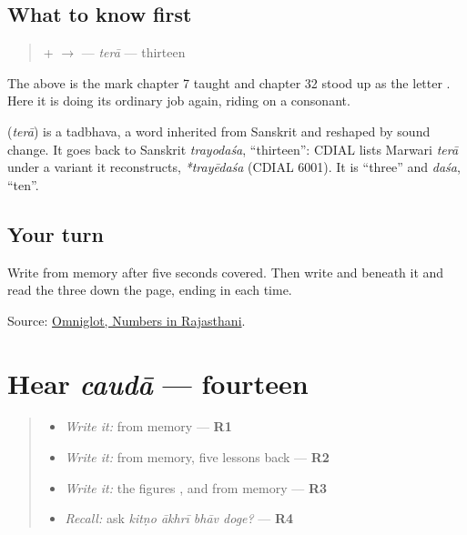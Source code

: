 \subsection*{What to know first}
\begin{quote}
\textbf{} + \textbf{} $\to$ \textbf{} — \emph{terā} — thirteen
\end{quote}

The \textbf{} above \textbf{} is the mark chapter 7 taught and chapter 32 stood up as the letter \textbf{}. Here it is doing its ordinary job again, riding on a consonant.

\begin{cousinweb}
\textbf{} (\emph{terā}) is a tadbhava, a word inherited from Sanskrit and reshaped by sound change. It goes back to Sanskrit \emph{trayodaśa}, \textquotedblleft{}thirteen\textquotedblright{}: CDIAL lists Marwari \emph{terā} under a variant it reconstructs, \emph{*trayēdaśa} (CDIAL 6001). It is \textquotedblleft{}three\textquotedblright{} and \emph{daśa}, \textquotedblleft{}ten\textquotedblright{}.
\end{cousinweb}

\subsection*{Your turn}
Write \textbf{} from memory after five seconds covered. Then write \textbf{} and \textbf{} beneath it and read the three down the page, ending in \textbf{} each time.

\begin{tcolorbox}[breakable,colback=teal!4,colframe=teal!35!black,title={Before you move on}]
Source: \href{https://www.omniglot.com/language/numbers/rajasthani.htm}{Omniglot, Numbers in Rajasthani}.
\end{tcolorbox}
\section[caudā]{Hear \emph{caudā} — fourteen}

\label{lesson:MW-C37-hear-chauda}



\begin{quote}
\begin{itemize}
\raggedright
  \item \emph{Write it:} \textbf{} from memory — \textbf{R1}
  \item \emph{Write it:} \textbf{} from memory, five lessons back — \textbf{R2}
  \item \emph{Write it:} the figures \textbf{}, \textbf{} and \textbf{} from memory — \textbf{R3}
  \item \emph{Recall:} ask \emph{kitṇo ākhrī bhāv doge?} — \textbf{R4}
\end{itemize}
\end{quote}

